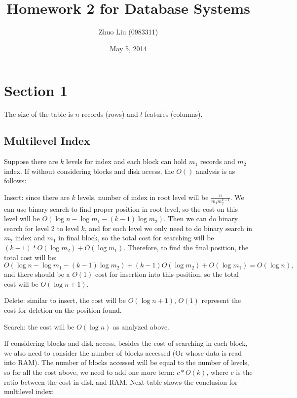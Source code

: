 \documentclass{article}
\author{Zhuo Liu (0983311)}
\title{Homework 2 for Database Systems}
\date{May 5, 2014}
\begin{document}
\maketitle

\section{Section 1}

The size of the table is $n$ records (rows) and $l$ features (columns).

\goodbreak

\subsection{Multilevel Index}

Suppose there are $k$ levels for index and each block can hold $m_{1}$ records and $m_{2}$ index. If without considering blocks and disk access, the $O()$ analysis is as follows:

Insert:
since there are $k$ levels, number of index in root level will be $\frac{n}{m_{1}m_{2}^{k-1}}$. We can use binary search to find proper position in root level, so the cost on this level will be $O(\log{n}-\log{m_{1}}-(k-1)\log{m_{2}})$. Then we can do binary search for level $2$ to level $k$, and for each level we only need to do binary search in $m_{2}$ index and $m_{1}$ in final block, so the total cost for searching will be $(k-1)*O(\log{m_{2}})+O(\log{m_{1}})$. Therefore, to find the final position, the total cost will be:
\begin{equation*}
O(\log{n}-\log{m_{1}}-(k-1)\log{m_{2}}) + (k-1)O(\log{m_{2}}) + O(\log{m_{1}})= O(\log{n}),
\end{equation*}
and there should be a $O(1)$ cost for insertion into this position, so the total cost will be $O(\log{n}+1)$.

Delete:
similar to insert, the cost will be $O(\log{n}+1)$, $O(1)$ represent the cost for deletion on the position found.

Search:
the cost will be $O(\log{n})$ as analyzed above.

If considering blocks and disk access, besides the cost of searching in each block, we also need to consider the number of blocks accessed (Or whose data is read into RAM). The number of blocks accessed will be equal to the number of levels, so for all the cost above, we need to add one more term: $c*O(k)$, where $c$ is the ratio between the cost in disk and RAM. Next table shows the conclusion for multilevel index:
\end{document}
